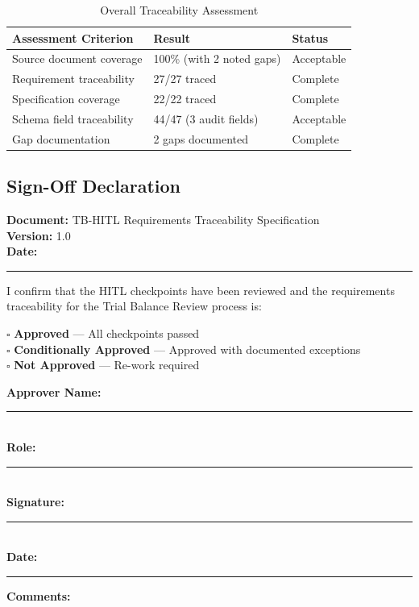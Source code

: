 \begin{table}[h]
\centering
\caption{Overall Traceability Assessment}
\begin{tabular}{@{}L{6cm}C{4cm}C{3cm}@{}}
\toprule
\textbf{Assessment Criterion} & \textbf{Result} & \textbf{Status} \\
\midrule
Source document coverage & 100\% (with 2 noted gaps) & Acceptable \\
Requirement traceability & 27/27 traced & Complete \\
Specification coverage & 22/22 traced & Complete \\
Schema field traceability & 44/47 (3 audit fields) & Acceptable \\
Gap documentation & 2 gaps documented & Complete \\
\bottomrule
\end{tabular}
\end{table}

\subsection{Sign-Off Declaration}

\begin{tcolorbox}[colback=white,colframe=sapblue,title=Final Sign-Off Declaration]
\textbf{Document:} TB-HITL Requirements Traceability Specification \\
\textbf{Version:} 1.0 \\
\textbf{Date:} \rule{3cm}{0.4pt}

\vspace{0.5cm}

I confirm that the HITL checkpoints have been reviewed and the requirements
traceability for the Trial Balance Review process is:

\vspace{0.3cm}
$\square$ \textbf{Approved} --- All checkpoints passed \\
$\square$ \textbf{Conditionally Approved} --- Approved with documented exceptions \\
$\square$ \textbf{Not Approved} --- Re-work required

\vspace{0.5cm}

\textbf{Approver Name:} \rule{5cm}{0.4pt} \\
\textbf{Role:} \rule{5cm}{0.4pt} \\
\textbf{Signature:} \rule{5cm}{0.4pt} \\
\textbf{Date:} \rule{3cm}{0.4pt}

\vspace{0.3cm}

\textbf{Comments:}
\vspace{1.5cm}
\end{tcolorbox}